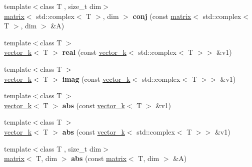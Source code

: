 \begin{DoxyCompactItemize}
\item 
\hypertarget{namespacekeycpp_a422c63d9cf20e676efbcefd445698aca}{{\footnotesize template$<$class T , size\-\_\-t dim$>$ }\\\hyperlink{classkeycpp_1_1matrix}{matrix}$<$ std\-::complex$<$ T $>$, dim $>$ {\bfseries conj} (const \hyperlink{classkeycpp_1_1matrix}{matrix}$<$ std\-::complex$<$ T $>$, dim $>$ \&A)}\label{namespacekeycpp_a422c63d9cf20e676efbcefd445698aca}

\item 
\hypertarget{namespacekeycpp_afb8f2e43eea5a213e424a068054c2f63}{{\footnotesize template$<$class T $>$ }\\\hyperlink{classkeycpp_1_1vector__k}{vector\-\_\-k}$<$ T $>$ {\bfseries real} (const \hyperlink{classkeycpp_1_1vector__k}{vector\-\_\-k}$<$ std\-::complex$<$ T $>$$>$ \&v1)}\label{namespacekeycpp_afb8f2e43eea5a213e424a068054c2f63}

\item 
\hypertarget{namespacekeycpp_a1b8755f394a54bc0255a526c5e870e28}{{\footnotesize template$<$class T $>$ }\\\hyperlink{classkeycpp_1_1vector__k}{vector\-\_\-k}$<$ T $>$ {\bfseries imag} (const \hyperlink{classkeycpp_1_1vector__k}{vector\-\_\-k}$<$ std\-::complex$<$ T $>$$>$ \&v1)}\label{namespacekeycpp_a1b8755f394a54bc0255a526c5e870e28}

\item 
\hypertarget{namespacekeycpp_a83cec179e95af014706ce54194efd1b9}{{\footnotesize template$<$class T $>$ }\\\hyperlink{classkeycpp_1_1vector__k}{vector\-\_\-k}$<$ T $>$ {\bfseries abs} (const \hyperlink{classkeycpp_1_1vector__k}{vector\-\_\-k}$<$ T $>$ \&v1)}\label{namespacekeycpp_a83cec179e95af014706ce54194efd1b9}

\item 
\hypertarget{namespacekeycpp_aa48f282087263edb46886e9390b9a833}{{\footnotesize template$<$class T $>$ }\\\hyperlink{classkeycpp_1_1vector__k}{vector\-\_\-k}$<$ T $>$ {\bfseries abs} (const \hyperlink{classkeycpp_1_1vector__k}{vector\-\_\-k}$<$ std\-::complex$<$ T $>$$>$ \&v1)}\label{namespacekeycpp_aa48f282087263edb46886e9390b9a833}

\item 
\hypertarget{namespacekeycpp_aeaeb417b7e61b4bbe200edc1315c7d2e}{{\footnotesize template$<$class T , size\-\_\-t dim$>$ }\\\hyperlink{classkeycpp_1_1matrix}{matrix}$<$ T, dim $>$ {\bfseries abs} (const \hyperlink{classkeycpp_1_1matrix}{matrix}$<$ T, dim $>$ \&A)}\label{namespacekeycpp_aeaeb417b7e61b4bbe200edc1315c7d2e}


\end{DoxyCompactItemize}
